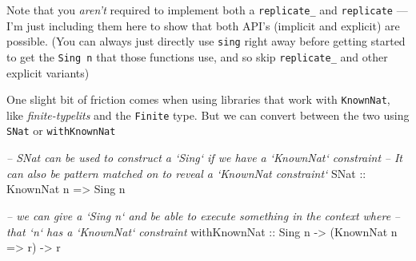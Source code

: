 \documentclass[]{article}
\newenvironment{Shaded}{}{}
\newcommand{\DataTypeTok}[1]{\textcolor[rgb]{0.56,0.13,0.00}{#1}}
\newcommand{\CommentTok}[1]{\textcolor[rgb]{0.38,0.63,0.69}{\textit{#1}}}
\newcommand{\OtherTok}[1]{\textcolor[rgb]{0.00,0.44,0.13}{#1}}
\newcommand{\NormalTok}[1]{#1}
\begin{document}
Note that you \emph{aren't} required to implement both a \texttt{replicate\_}
and \texttt{replicate} --- I'm just including them here to show that both API's
(implicit and explicit) are possible. (You can always just directly use
\texttt{sing} right away before getting started to get the \texttt{Sing\ n} that
those functions use, and so skip \texttt{replicate\_} and other explicit
variants)

One slight bit of friction comes when using libraries that work with
\texttt{KnownNat}, like \emph{finite-typelits} and the \texttt{Finite} type. But
we can convert between the two using \texttt{SNat} or \texttt{withKnownNat}

\begin{Shaded}
\begin{Highlighting}[]
\CommentTok{-- SNat can be used to construct a `Sing` if we have a `KnownNat` constraint}
\CommentTok{-- It can also be pattern matched on to reveal a `KnownNat constraint`}
\DataTypeTok{SNat}\OtherTok{ ::} \DataTypeTok{KnownNat}\NormalTok{ n }\OtherTok{=>} \DataTypeTok{Sing}\NormalTok{ n}

\CommentTok{-- we can give a `Sing n` and be able to execute something in the context where}
\CommentTok{-- that `n` has a `KnownNat` constraint}
\OtherTok{withKnownNat ::} \DataTypeTok{Sing}\NormalTok{ n }\OtherTok{->}\NormalTok{ (}\DataTypeTok{KnownNat}\NormalTok{ n }\OtherTok{=>}\NormalTok{ r) }\OtherTok{->}\NormalTok{ r}
\end{Highlighting}
\end{Shaded}
\end{document}
